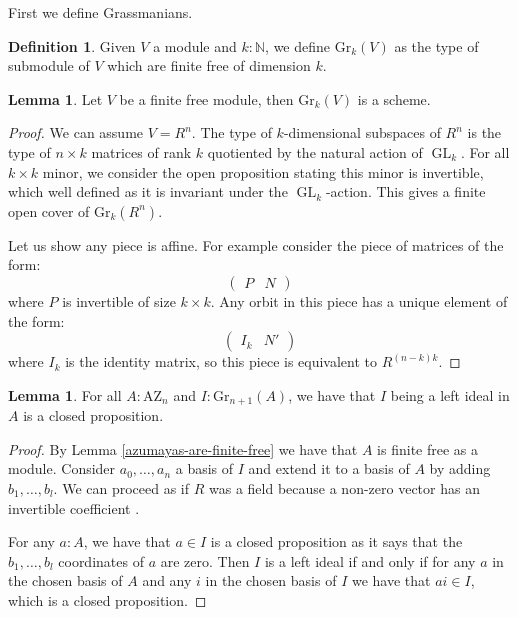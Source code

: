 \documentclass[10pt,a4paper]{article}
\theoremstyle{definition}
\newtheorem{lemma}[theorem]{Lemma}
\newtheorem{definition}[theorem]{Definition}
\newcommand{\Gr}{\mathrm{Gr}}
\DeclareMathOperator{\GL}{GL}
\newcommand{\AZ}{\mathrm{AZ}}
\newcommand{\N}{\mathbb{N}}
\begin{document}
First we define Grassmanians.

\begin{definition}
Given $V$ a module and $k:\N$, we define $\Gr_k(V)$ as the type of submodule of $V$ which are finite free of dimension $k$.
\end{definition}

\begin{lemma}\label{grassmanians-are-schemes}
Let $V$ be a finite free module, then $\Gr_k(V)$ is a scheme.
\end{lemma}

\begin{proof}
We can assume $V=R^n$. The type of $k$-dimensional subspaces of $R^n$ is the type of $n\times k$ matrices of rank $k$ quotiented by the natural action of $\GL_k$. For all $k\times k$ minor, we consider the open proposition stating this minor is invertible, which well defined as it is invariant under the $\GL_k$-action. This gives a finite open cover of $\Gr_k(R^n)$.

Let us show any piece is affine. For example consider the piece of matrices of the form:
\[\begin{pmatrix}
P & N
\end{pmatrix}\]
where $P$ is invertible of size $k\times k$. Any orbit in this piece has a unique element of the form:
\[\begin{pmatrix}
I_k & N'
\end{pmatrix}\]
where $I_k$ is the identity matrix, so this piece is equivalent to $R^{(n-k)k}$.
\end{proof}

\begin{lemma}\label{being-ideal-in-azumaya-closed}
For all $A:\AZ_n$ and $I:\Gr_{n+1}(A)$, we have that $I$ being a left ideal in $A$ is a closed proposition.
\end{lemma}

\begin{proof}
By Lemma \ref{azumayas-are-finite-free} we have that $A$ is finite free as a module. Consider $a_0,\hdots,a_n$ a basis of $I$ and extend it to a basis of $A$ by adding $b_1,\hdots,b_l$. We can proceed as if $R$ was a field because a non-zero vector has an invertible coefficient \cite{draft}.

For any $a:A$, we have that $a\in I$ is a closed proposition as it says that the $b_1,\hdots,b_l$ coordinates of $a$ are zero. Then $I$ is a left ideal if and only if for any $a$ in the chosen basis of $A$ and any $i$ in the chosen basis of $I$ we have that $ai\in I$, which is a closed proposition.
\end{proof}
\end{document}
